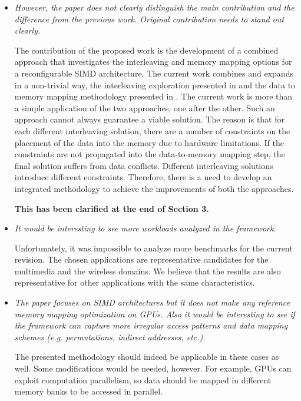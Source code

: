 \documentclass[12pt,a4paper,notitlepage]{article}
\begin{document}
\begin{itemize}

\item \textit{However, the paper does not clearly distinguish the main contribution and 
the difference from the previous work. Original contribution needs to stand
out clearly.}

The contribution of the proposed work is the development of a combined approach that investigates the interleaving and memory mapping options for a reconfigurable SIMD architecture.  
The current work combines and expands in a non-trivial way, the interleaving exploration presented in \cite{sharma2013data} and the data to memory mapping methodology presented in \cite{filippopoulos2013exploration}. 
The current work is more than a simple application of the two approaches, one after the other.
Such an approach cannot always guarantee a viable solution.
The reason is that for each different interleaving solution, there are a number of constraints on the placement of the data into the memory due to hardware limitations.
If the constraints are not propagated into the data-to-memory mapping step, the final solution suffers from data conflicts.
Different interleaving solutions introduce different constraints. 
Therefore, there is a need to develop an integrated methodology to achieve the improvements of both the approaches.

\textbf{This has been clarified at the end of Section 3.}

\item \textit{It would be interesting to see more workloads analyzed in the framework.}

Unfortunately, it was impossible to analyze more benchmarks for the current revision. 
The chosen applications are representative candidates for the multimedia and the wireless domains.
We believe that the results are also representative for other applications with the same characteristics.

\item \textit{The paper focuses on SIMD architectures but it does not make any reference memory mapping optimization on GPUs. Also it would be interesting to
see if the framework can capture more irregular access patterns and data mapping schemes (e.g. permutations, indirect addresses, etc.). }

The presented methodology should indeed be applicable in these cases as well. 
Some modifications would be needed, however.
For example, GPUs can exploit computation parallelism, so data should be mapped in different memory banks to be accessed in parallel.


\end{itemize}
\end{document}
